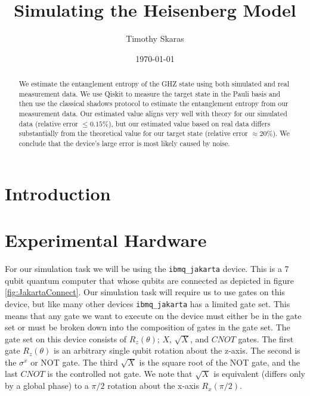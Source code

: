 \documentclass[aps,prl, reprint]{revtex4-2}
\begin{document}
\title{Simulating the Heisenberg Model}
\date{\today}
\author{Timothy Skaras}
\begin{abstract}
We estimate the entanglement entropy of the GHZ state using both simulated and real measurement data. We use Qiskit to measure the target state in the Pauli basis and then use the classical shadows protocol to estimate the entanglement entropy from our measurement data. Our estimated value aligns very well with theory for our simulated data (relative error $\leq 0.15\%$), but our estimated value based on real data differs substantially from the theoretical value for our target state (relative error $\approx 20\%$). We conclude that the device's large error is most likely caused by noise.
\end{abstract}

\maketitle

\section{Introduction}

\section{Experimental Hardware}

For our simulation task we will be using the \texttt{ibmq\_jakarta} device. This is a 7 qubit quantum computer that whose qubits are connected as depicted in figure \ref{fig:JakartaConnect}. Our simulation task will require us to use gates on this device, but like many other devices \texttt{ibmq\_jakarta} has a limited gate set. This means that any gate we want to execute on the device must either be in the gate set or must be broken down into the composition of gates in the gate set. The gate set on this device consists of $R_z(\theta)$; $X$, $\sqrt{X}$, and $CNOT$ gates. The first gate $R_z(\theta)$ is an arbitrary single qubit rotation about the z-axis. The second is the $\sigma^{x}$ or NOT gate. The third $\sqrt{X}$ is the square root of the NOT gate, and the last $CNOT$ is the controlled not gate. We note that $\sqrt{X}$ is equivalent (differs only by a global phase) to a $\pi/2$ rotation about the x-axis $R_x(\pi/2)$.
\end{document}

